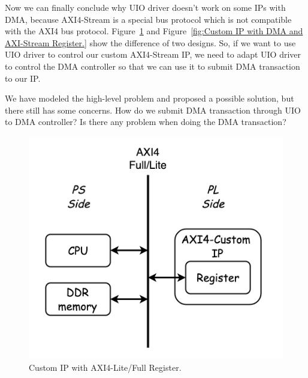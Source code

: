 Now we can finally conclude why UIO driver doesn't work on some IPs with DMA, because AXI4-Stream is a special bus protocol which is not compatible with the AXI4 bus protocol. Figure~\ref{fig:Custom IP with AXI4-Lite/Full Register.} and Figure~\ref{fig:Custom IP with DMA and AXI-Stream Register.} show the difference of two designs. So, if we want to use UIO driver to control our custom AXI4-Stream IP, we need to adapt UIO driver to control the DMA controller so that we can use it to submit DMA transaction to our IP.

We have modeled the high-level problem and proposed a possible solution, but there still has some concerns. How do we submit DMA transaction through UIO to DMA controller? Is there any problem when doing the DMA transaction? 


\newpage
\begin{figure}[!htb]
  \centering
  \includegraphics[scale=0.3]{images/customAXI4IP.jpg}
  \caption[Custom IP with AXI4-Lite/Full Register.]{Custom IP with AXI4-Lite/Full Register.}
  \label{fig:Custom IP with AXI4-Lite/Full Register.}
\end{figure}

